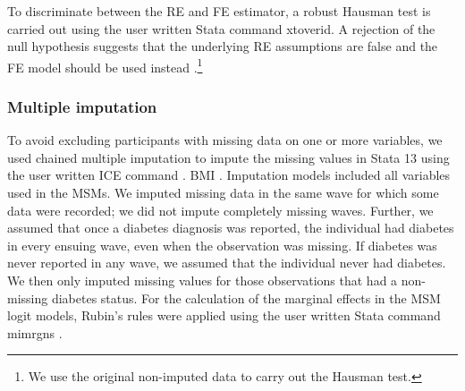 To discriminate between the \ac{RE} and \ac{FE} estimator, a robust Hausman test is carried out using the user written Stata command xtoverid. A rejection of the null hypothesis suggests that the underlying \ac{RE} assumptions are false and the \ac{FE} model should be used instead \parencite{Wooldridge2012}.\footnote{We use the original non-imputed data to carry out the Hausman test.} 



\subsubsection{Multiple imputation}

To avoid excluding participants with missing data on one or more variables, we used chained multiple imputation to impute the missing values in Stata 13 using the user written ICE command \parencite{Royston2009}. \DIFdelbegin {}\DIFdelend \DIFaddbegin {}\ac{BMI}   \textcite{White2011,Bodner2008} \DIFaddend . Imputation models included all variables used in the \acp{MSM}. We imputed missing data in the same wave for which some data were recorded; we did not impute completely missing waves. Further, we assumed that once a diabetes diagnosis was reported, the individual had diabetes in every ensuing wave, even when the observation was missing. If diabetes was never reported in any wave, we assumed that the individual never had diabetes. We then only imputed missing values for those observations that had a non-missing diabetes status. For the calculation of the marginal effects in the \ac{MSM} logit models, Rubin's rules were applied using the user written Stata command mimrgns \parencite{Klein2014}.

